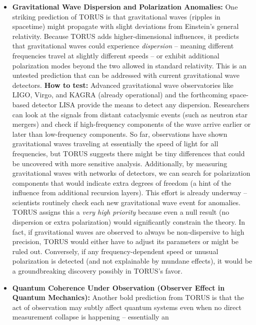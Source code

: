 \documentclass[
]{article}
\begin{document}
\begin{itemize}
\item
  \textbf{Gravitational Wave Dispersion and Polarization Anomalies:} One
  striking prediction of TORUS is that gravitational waves (ripples in
  spacetime) might propagate with slight deviations from Einstein's
  general relativity. Because TORUS adds higher-dimensional influences,
  it predicts that gravitational waves could experience
  \emph{dispersion} -- meaning different frequencies travel at slightly
  different speeds -- or exhibit additional polarization modes beyond
  the two allowed in standard relativity. This is an untested prediction
  that can be addressed with current gravitational wave detectors.
  \textbf{How to test:} Advanced gravitational wave observatories like
  LIGO, Virgo, and KAGRA (already operational) and the forthcoming
  space-based detector LISA provide the means to detect any dispersion.
  Researchers can look at the signals from distant cataclysmic events
  (such as neutron star mergers) and check if high-frequency components
  of the wave arrive earlier or later than low-frequency components. So
  far, observations have shown gravitational waves traveling at
  essentially the speed of light for all frequencies, but TORUS suggests
  there might be tiny differences that could be uncovered with more
  sensitive analysis\hspace{0pt}. Additionally, by measuring
  gravitational waves with networks of detectors, we can search for
  polarization components that would indicate extra degrees of freedom
  (a hint of the influence from additional recursion layers). This
  effort is already underway -- scientists routinely check each new
  gravitational wave event for anomalies. TORUS assigns this a
  \emph{very high priority} because even a null result (no dispersion or
  extra polarization) would significantly constrain the
  theory\hspace{0pt}. In fact, if gravitational waves are observed to
  always be non-dispersive to high precision, TORUS would either have to
  adjust its parameters or might be ruled out. Conversely, if any
  frequency-dependent speed or unusual polarization is detected (and not
  explainable by mundane effects), it would be a groundbreaking
  discovery possibly in TORUS's favor.
\item
  \textbf{Quantum Coherence Under Observation (Observer Effect in
  Quantum Mechanics):} Another bold prediction from TORUS is that the
  act of observation may subtly affect quantum systems even when no
  direct measurement collapse is happening -- essentially an

\end{itemize}
\end{document}
